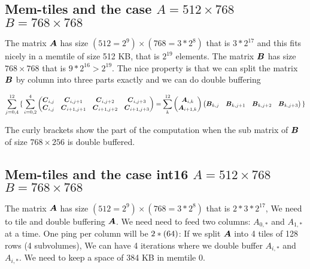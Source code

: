 \documentclass[conference]{IEEEtran}
\begin{document}
\subsection{Mem-tiles and the case   $A=512\times 768$ $B=768\times 768$ }

The matrix ${\boldsymbol A}$ has size $(512=2^9) \times (768= 3*2^8)$ that is
$3*2^{17}$ and this fits nicely in a memtile of size 512 KB, that is
$2^{19}$ elements.  The matrix ${\boldsymbol B}$ has size $768 \times 768$ that
is $9*2^{16}>2^{19}$. The nice property is that we can split the
matrix ${\boldsymbol B}$ by column into three parts exactly and we can do
double buffering


{\small \begin{equation*}
    \sum_{j=0,4}^{12}
    { \{ } \sum_{i=0,2}^4
  \begin{pmatrix}
    {\boldsymbol C}_{i,j}  & {\boldsymbol C}_{i,j+1}    & {\boldsymbol C}_{i,j+2}    &{\boldsymbol C}_{i,j+3} \\
    {\boldsymbol C}_{i,j}  & {\boldsymbol C}_{i+1,j+1}   & {\boldsymbol C}_{i+1,j+2}  & {\boldsymbol C}_{i+1,j+3} \\
  \end{pmatrix}    = \sum_k^{12}
  \begin{pmatrix}
    {\boldsymbol A}_{i,k}  \\
    {\boldsymbol A}_{i+1,k}   \\
  \end{pmatrix}  
  \begin{pmatrix}
    {\boldsymbol B}_{k,j}  &  {\boldsymbol B}_{k,j+1}  & {\boldsymbol B}_{k,j+2}  &{\boldsymbol B}_{k,j+3} \\
  \end{pmatrix}
  { \}}    
\end{equation*}
}

The curly brackets show the part of the computation when the sub
matrix of ${\boldsymbol B}$ of size $768 \times 256$ is double buffered.

\subsection{Mem-tiles and the case  int16  $A=512\times 768$ $B=768\times 768$ }

The matrix ${\boldsymbol A}$ has size $(512=2^9) \times (768= 3*2^8)$ that is
$2*3*2^{17}$, We need to tile and double buffering ${\boldsymbol A}$.  We need
need to feed two columns: $A_{0,*}$ and $A_{1,*}$ at a time. One ping
per column will be $2*(64 \time 768)$: If we split ${\boldsymbol A}$ into 4
tiles of 128 rows (4 subvolumes), We can have 4 iterations where we
double buffer $A_{i,*}$ and $A_{i,*}$. We need to keep a space of 384
KB in memtile 0.
\end{document}
